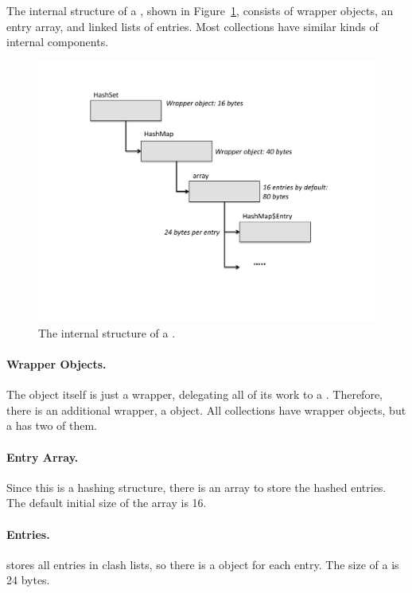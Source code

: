  The internal
structure of a , shown in Figure~\ref{fig:hashset_new}, consists
of wrapper objects, an entry array, and linked lists of entries. Most
collections have similar kinds of internal components.
 \begin{figure}
  \centering
 \includegraphics[width=.80\textwidth]{part1/Figures/collections/hashset_new.pdf}
  \caption{The internal structure of a .}
  \label{fig:hashset_new}
\end{figure}



\paragraph{Wrapper Objects.}
The  object itself is just a wrapper, delegating all of its work
to a . Therefore, there is an additional wrapper, a  object. All
collections have wrapper objects, but a  has two of them.
 
\paragraph{Entry Array.}
Since this is a hashing structure, there is an array to store the hashed
entries. The default initial size of the array is 16.
 
\paragraph{Entries.} 
 stores all entries in clash lists, so there is a
 object for each  entry. The size of a
 is 24 bytes.
\paragraph{}


